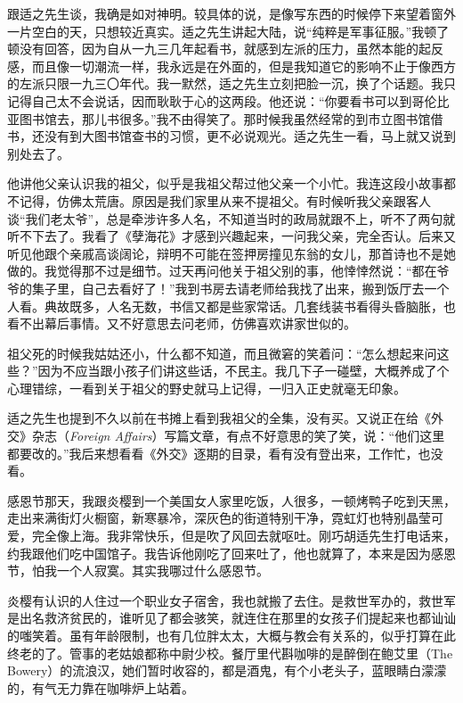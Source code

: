 \par 跟适之先生谈，我确是如对神明。较具体的说，是像写东西的时候停下来望着窗外一片空白的天，只想较近真实。适之先生讲起大陆，说“纯粹是军事征服。”我顿了顿没有回答，因为自从一九三几年起看书，就感到左派的压力，虽然本能的起反感，而且像一切潮流一样，我永远是在外面的，但是我知道它的影响不止于像西方的左派只限一九三〇年代。我一默然，适之先生立刻把脸一沉，换了个话题。我只记得自己太不会说话，因而耿耿于心的这两段。他还说：“你要看书可以到哥伦比亚图书馆去，那儿书很多。”我不由得笑了。那时候我虽然经常的到市立图书馆借书，还没有到大图书馆查书的习惯，更不必说观光。适之先生一看，马上就又说到别处去了。
\par 他讲他父亲认识我的祖父，似乎是我祖父帮过他父亲一个小忙。我连这段小故事都不记得，仿佛太荒唐。原因是我们家里从来不提祖父。有时候听我父亲跟客人谈“我们老太爷”，总是牵涉许多人名，不知道当时的政局就跟不上，听不了两句就听不下去了。我看了《孽海花》才感到兴趣起来，一问我父亲，完全否认。后来又听见他跟个亲戚高谈阔论，辩明不可能在签押房撞见东翁的女儿，那首诗也不是她做的。我觉得那不过是细节。过天再问他关于祖父别的事，他悻悻然说：“都在爷爷的集子里，自己去看好了！”我到书房去请老师给我找了出来，搬到饭厅去一个人看。典故既多，人名无数，书信又都是些家常话。几套线装书看得头昏脑胀，也看不出幕后事情。又不好意思去问老师，仿佛喜欢讲家世似的。
\par 祖父死的时候我姑姑还小，什么都不知道，而且微窘的笑着问：“怎么想起来问这些？”因为不应当跟小孩子们讲这些话，不民主。我几下子一碰壁，大概养成了个心理错综，一看到关于祖父的野史就马上记得，一归入正史就毫无印象。
\par 适之先生也提到不久以前在书摊上看到我祖父的全集，没有买。又说正在给《外交》杂志（\textsl{Foreign Affairs}）写篇文章，有点不好意思的笑了笑，说：“他们这里都要改的。”我后来想看看《外交》逐期的目录，看有没有登出来，工作忙，也没看。
\par 感恩节那天，我跟炎樱到一个美国女人家里吃饭，人很多，一顿烤鸭子吃到天黑，走出来满街灯火橱窗，新寒暴冷，深灰色的街道特别干净，霓虹灯也特别晶莹可爱，完全像上海。我非常快乐，但是吹了风回去就呕吐。刚巧胡适先生打电话来，约我跟他们吃中国馆子。我告诉他刚吃了回来吐了，他也就算了，本来是因为感恩节，怕我一个人寂寞。其实我哪过什么感恩节。
\par 炎樱有认识的人住过一个职业女子宿舍，我也就搬了去住。是救世军办的，救世军是出名救济贫民的，谁听见了都会骇笑，就连住在那里的女孩子们提起来也都讪讪的嗤笑着。虽有年龄限制，也有几位胖太太，大概与教会有关系的，似乎打算在此终老的了。管事的老姑娘都称中尉少校。餐厅里代斟咖啡的是醉倒在鲍艾里（The Bowery）的流浪汉，她们暂时收容的，都是酒鬼，有个小老头子，蓝眼睛白濛濛的，有气无力靠在咖啡炉上站着。
